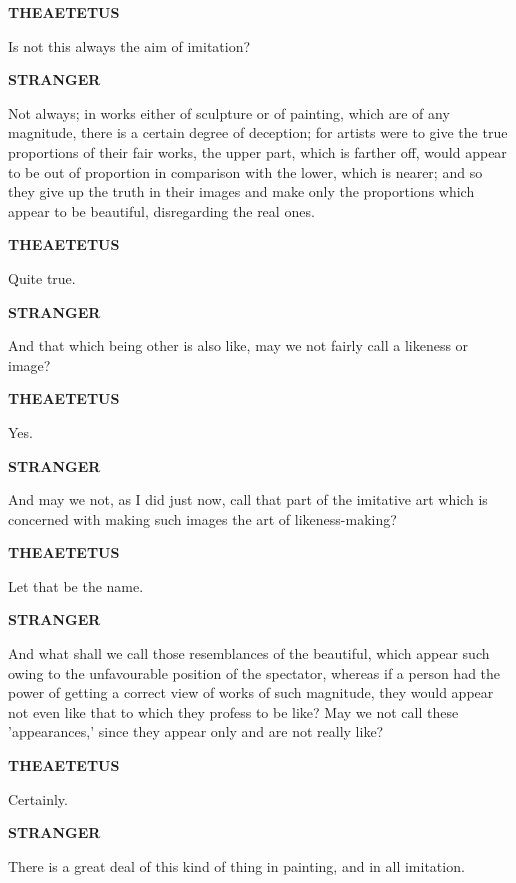 \documentclass[11pt,letter]{article}
\begin{document}
\par \textbf{THEAETETUS}
\par   Is not this always the aim of imitation?

\par \textbf{STRANGER}
\par   Not always; in works either of sculpture or of painting, which are of any magnitude, there is a certain degree of deception; for artists were to give the true proportions of their fair works, the upper part, which is farther off, would appear to be out of proportion in comparison with the lower, which is nearer; and so they give up the truth in their images and make only the proportions which appear to be beautiful, disregarding the real ones.

\par \textbf{THEAETETUS}
\par   Quite true.

\par \textbf{STRANGER}
\par   And that which being other is also like, may we not fairly call a likeness or image?

\par \textbf{THEAETETUS}
\par   Yes.

\par \textbf{STRANGER}
\par   And may we not, as I did just now, call that part of the imitative art which is concerned with making such images the art of likeness-making?

\par \textbf{THEAETETUS}
\par   Let that be the name.

\par \textbf{STRANGER}
\par   And what shall we call those resemblances of the beautiful, which appear such owing to the unfavourable position of the spectator, whereas if a person had the power of getting a correct view of works of such magnitude, they would appear not even like that to which they profess to be like? May we not call these 'appearances,' since they appear only and are not really like?

\par \textbf{THEAETETUS}
\par   Certainly.

\par \textbf{STRANGER}
\par   There is a great deal of this kind of thing in painting, and in all imitation.
\end{document}
